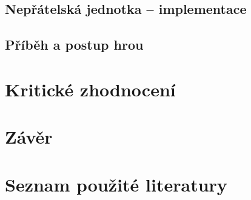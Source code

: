 \documentclass[FM,Proj]{tulthesis}
\begin{document}
	\section{Nepřátelská jednotka – implementace} %
	\label{chpFSM}
	
	\section{Příběh a postup hrou}
	 
	\chapter{Kritické zhodnocení}
	
	\chapter{Závěr}
	
	\chapter*{Seznam použité literatury}
	\printbibliography[heading=none]
	
\end{document}
